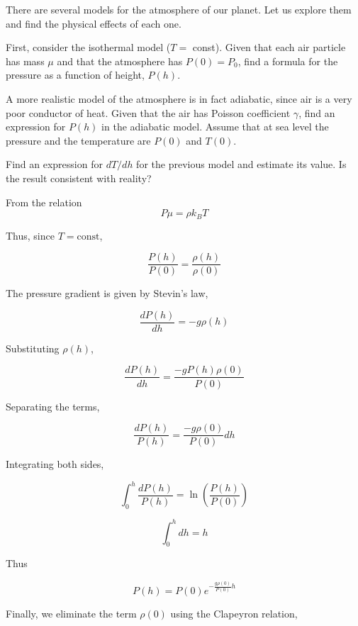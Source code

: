 \documentclass[11pt]{article}
\begin{document}
\begin{pproblem}
    There are several models for the atmosphere of our planet. Let us explore them and find the physical effects of each one.
    \begin{alternativas}
        \item First, consider the isothermal model (\(T=\) const). Given that each air particle has mass \(\mu\) and that the atmosphere has \(P(0) = P_0\), find a formula for the pressure as a function of height, \(P(h)\).
        \item A more realistic model of the atmosphere is in fact adiabatic, since air is a very poor conductor of heat. Given that the air has Poisson coefficient \(\gamma\), find an expression for \(P(h)\) in the adiabatic model. Assume that at sea level the pressure and the temperature are \(P(0)\) and \(T(0)\).
        \item Find an expression for \(dT/dh\) for the previous model and estimate its value. Is the result consistent with reality?
    \end{alternativas}

\begin{pssolution*}{}{}
    \begin{alternativas}
        \item From the relation
        \[P\mu = \rho k_BT\]

        Thus, since \(T = \mathrm{const}\),

        \[\frac{P(h)}{P(0)} = \frac{\rho(h)}{\rho(0)}\]

        The pressure gradient is given by Stevin's law,

        \[\frac{dP(h)}{dh} = -g\rho(h)\]

        Substituting \(\rho(h)\),

        \[\frac{dP(h)}{dh} = \frac{-gP(h)\rho(0)}{P(0)}\]

        Separating the terms,

        \[\frac{dP(h)}{P(h)} = \frac{-g\rho(0)}{P(0)}dh\]

        Integrating both sides,

        \[\int_0^h\frac{dP(h)}{P(h)} = \ln\left(\frac{P(h)}{P(0)}\right)\]

        \[\int_0^hdh = h\]

        Thus

        \[P(h) = P(0)e^{-\frac{g\rho(0)}{P(0)}h}\]

        Finally, we eliminate the term \(\rho(0)\) using the Clapeyron relation,


\end{alternativas}
\end{pssolution*}
\end{pproblem}
\end{document}
